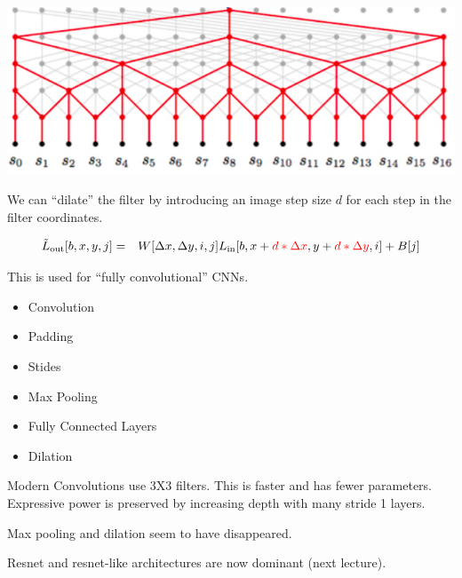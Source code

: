 {

\centerline{\includegraphics[width=8.0in]{../images/dilation}}


We can ``dilate'' the filter by introducing an image step size $d$ for each step in the filter coordinates.

\vfill
\begin{eqnarray*}
\tilde{L}_{\mathrm{out}}[b,x,y,j] & = &  W[\Delta x, \Delta y, i, j] L_{\mathrm{in}}[b,x + {\color{red} d*\Delta x}, y + {\color{red} d*\Delta y}, i] + B[j]
\end{eqnarray*}

This is used for ``fully convolutional'' CNNs.



\begin{itemize}
\item Convolution

\vfill
\item Padding

  \vfill
\item Stides

  \vfill
\item Max Pooling

  \vfill
\item Fully Connected Layers

  \vfill
\item Dilation
\end{itemize}


Modern Convolutions use 3X3 filters.  This is faster and has fewer parameters.  Expressive power is preserved by increasing depth with many stride 1 layers.

\vfill
Max pooling and dilation seem to have disappeared.

\vfill
Resnet and resnet-like architectures are now dominant (next lecture).



}

